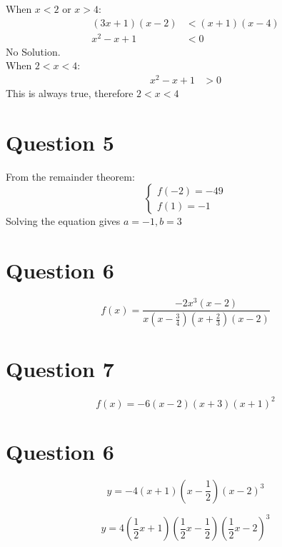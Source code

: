 \documentclass{article}
\begin{document}
\begin{custom-big}[Part b]
When $x<2$ or $x>4$:\\
\begin{align*}
    (3x+1)(x-2)&<(x+1)(x-4)\\
    x^2-x+1&<0
\end{align*}
No Solution.\\
When $2<x<4$:\\
\begin{align*}
    x^2-x+1&>0
\end{align*}
This is always true, therefore $2<x<4$
\end{custom-big}


\section{Question 5}
\begin{custom-big}[Solution]
From the remainder theorem:
\[
\begin{cases}
f(-2)=-49\\
f(1)=-1
\end{cases}
\]
Solving the equation gives $a=-1,b=3$
\end{custom-big}

\pagebreak
\section{Question 6}
\begin{custom-big}[Solution]
\[
f(x)=\frac{-2x^3(x-2)}{x\left(x-\frac 34\right)\left(x+\frac 23\right)(x-2)}\]
\end{custom-big}

\section{Question 7}
\begin{custom-big}[Solution]
\[
f(x)=-6(x-2)(x+3)(x+1)^2\]
\end{custom-big}



\section{Question 6}
\begin{custom-big}[Part a]
\[
y=-4\left(x+1\right)\left(x-\frac 12\right)\left(x-2\right)^3\]
\end{custom-big}

\begin{custom-big}[Part b]
\[
y=4\left(\frac 12 x+1\right)\left(\frac 12 x-\frac 12\right)\left(\frac 12 x-2\right)^3\]
\end{custom-big}
\end{document}
